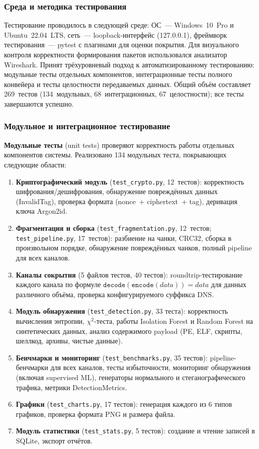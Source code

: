 \subsubsection{Среда и методика тестирования}

Тестирование проводилось в следующей среде: ОС~--- Windows~10~Pro и Ubuntu~22.04~LTS, сеть~--- loopback-интерфейс (127.0.0.1), фреймворк тестирования~--- pytest с плагинами для оценки покрытия. Для визуального контроля корректности формирования пакетов использовался анализатор Wireshark. Принят трёхуровневый подход к автоматизированному тестированию: модульные тесты отдельных компонентов, интеграционные тесты полного конвейера и тесты целостности передаваемых данных. Общий объём составляет 269~тестов (134~модульных, 68~интеграционных, 67~целостности); все тесты завершаются успешно.

\subsubsection{Модульное и интеграционное тестирование}

\textbf{Модульные тесты} (unit tests) проверяют корректность работы отдельных компонентов системы. Реализовано 134 модульных теста, покрывающих следующие области:

\begin{enumerate}[label=\arabic*)]
    \item \textbf{Криптографический модуль} (\texttt{test\_crypto.py}, 12~тестов): корректность шифрования/дешифрования, обнаружение повреждённых данных (InvalidTag), проверка формата (nonce~+ ciphertext~+ tag), деривация ключа Argon2id.
    \item \textbf{Фрагментация и сборка} (\texttt{test\_fragmentation.py}, 12~тестов; \texttt{test\_pipeline.py}, 17~тестов): разбиение на чанки, CRC32, сборка в произвольном порядке, обнаружение повреждённых чанков, полный pipeline для всех каналов.
    \item \textbf{Каналы сокрытия} (5 файлов тестов, 40 тестов): roundtrip-тестирование каждого канала по формуле $\texttt{decode}(\texttt{encode}(data)) = data$ для данных различного объёма, проверка конфигурируемого суффикса DNS.
    \item \textbf{Модуль обнаружения} (\texttt{test\_detection.py}, 33 теста): корректность вычисления энтропии, $\chi^2$-теста, работы Isolation Forest и Random Forest на синтетических данных, анализ содержимого payload (PE, ELF, скрипты, шеллкод, архивы, чистые данные).
    \item \textbf{Бенчмарки и мониторинг} (\texttt{test\_benchmarks.py}, 35 тестов): pipeline-бенчмарки для всех каналов, тесты избыточности, мониторинг обнаружения (включая supervised ML), генераторы нормального и стеганографического трафика, метрики DetectionMetrics.
    \item \textbf{Графики} (\texttt{test\_charts.py}, 17 тестов): генерация каждого из 6 типов графиков, проверка формата PNG и размера файла.
    \item \textbf{Модуль статистики} (\texttt{test\_stats.py}, 5 тестов): создание и чтение записей в SQLite, экспорт отчётов.
\end{enumerate}

